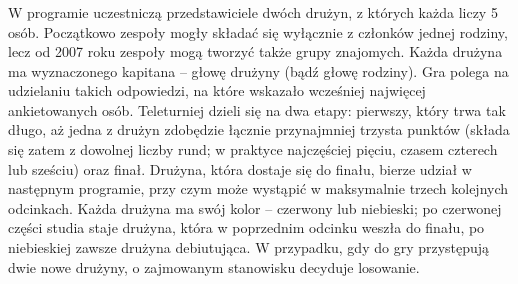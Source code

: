 \documentclass{beamer}
\begin{document}
\begin{frame}

\frametitle{}
\small{W programie uczestniczą przedstawiciele dwóch drużyn, z których każda liczy 5 osób. Początkowo zespoły mogły składać się 
wyłącznie z członków jednej rodziny, lecz od 2007 roku zespoły mogą tworzyć także grupy znajomych. Każda drużyna ma wyznaczonego 
kapitana – głowę drużyny (bądź głowę rodziny). Gra polega na udzielaniu takich odpowiedzi, na które wskazało wcześniej najwięcej 
ankietowanych osób. Teleturniej dzieli się na dwa etapy: pierwszy, który trwa tak długo, aż jedna z drużyn zdobędzie łącznie 
przynajmniej trzysta punktów (składa się zatem z dowolnej liczby rund; w praktyce najczęściej pięciu, czasem czterech lub sześciu) oraz 
finał. Drużyna, która dostaje się do finału, bierze udział w następnym programie, przy czym może wystąpić w maksymalnie trzech kolejnych 
odcinkach. Każda drużyna ma swój kolor – czerwony lub niebieski; po czerwonej części studia staje drużyna, która w poprzednim odcinku 
weszła do finału, po niebieskiej zawsze drużyna debiutująca. W przypadku, gdy do gry przystępują dwie nowe drużyny, o zajmowanym 
stanowisku decyduje losowanie.}

\end{frame}
\begin{frame}


\end{frame}
\end{document}

